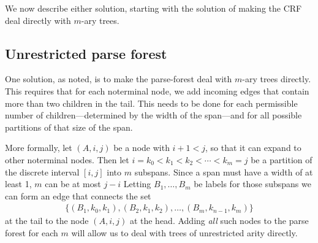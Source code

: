     We now describe either solution, starting with the solution of making the CRF deal directly with $m$-ary trees.

  \subsection{Unrestricted parse forest}
    One solution, as noted, is to make the parse-forest deal with $m$-ary trees directly. This requires that for each noterminal node, we add incoming edges that contain more than two children in the tail. This needs to be done for each permissible number of children---determined by the width of the span---and for all possible partitions of that size of the span.

    More formally, let $(A,i,j)$ be a node with $i + 1 < j$, so that it can expand to other noterminal nodes. Then let $i = k_0 < k_1 < k_2 < \cdots < k_m = j$ be a partition of the discrete interval $[i, j]$ into $m$ subspans. Since a span must have a width of at least 1, $m$ can be at most $j-i$ Letting $B_1, \dots, B_m$ be labels for those subspans we can form an edge that connects the set
    \begin{align*}
      \Big\{ (B_1, k_0, k_1), (B_2, k_1, k_2), \dots, (B_m, k_{n-1}, k_m) \Big\}
    \end{align*}
    at the tail to the node $(A, i, j)$ at the head. Adding \textit{all} such nodes to the parse forest for each $m$ will allow us to deal with trees of unrestricted arity directly.

